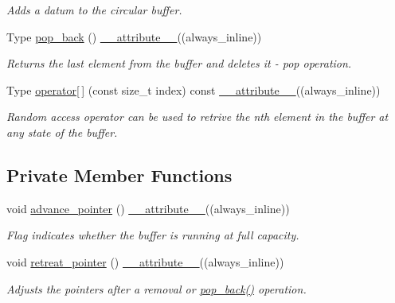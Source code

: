 \begin{DoxyCompactItemize}
\begin{DoxyCompactList}\small\item\em Adds a datum to the circular buffer. \end{DoxyCompactList}\item 
Type \hyperlink{classCircular__Buffer_a0b7b0fb1ecffc75ba233fed043616313}{pop\+\_\+back} () \hyperlink{utilities_8hpp_a103d5b3998e0dd804213c8f30a094f4d}{\+\_\+\+\_\+attribute\+\_\+\+\_\+}((always\+\_\+inline))
\begin{DoxyCompactList}\small\item\em Returns the last element from the buffer and deletes it -\/ pop operation. \end{DoxyCompactList}\item 
Type \hyperlink{classCircular__Buffer_a520f88f6e08b618a3b2923f157db541d}{operator\mbox{[}$\,$\mbox{]}} (const size\+\_\+t index) const \hyperlink{utilities_8hpp_a103d5b3998e0dd804213c8f30a094f4d}{\+\_\+\+\_\+attribute\+\_\+\+\_\+}((always\+\_\+inline))
\begin{DoxyCompactList}\small\item\em Random access operator can be used to retrive the nth element in the buffer at any state of the buffer. \end{DoxyCompactList}\end{DoxyCompactItemize}
\subsection*{Private Member Functions}
\begin{DoxyCompactItemize}
\item 
void \hyperlink{classCircular__Buffer_a4ec86fd625e56d17abe155895cc4cc1b}{advance\+\_\+pointer} () \hyperlink{utilities_8hpp_a103d5b3998e0dd804213c8f30a094f4d}{\+\_\+\+\_\+attribute\+\_\+\+\_\+}((always\+\_\+inline))
\begin{DoxyCompactList}\small\item\em Flag indicates whether the buffer is running at full capacity. \end{DoxyCompactList}\item 
void \hyperlink{classCircular__Buffer_a2b13869f0a5a4904142241a3d15ff141}{retreat\+\_\+pointer} () \hyperlink{utilities_8hpp_a103d5b3998e0dd804213c8f30a094f4d}{\+\_\+\+\_\+attribute\+\_\+\+\_\+}((always\+\_\+inline))
\begin{DoxyCompactList}\small\item\em Adjusts the pointers after a removal or \hyperlink{classCircular__Buffer_a0b7b0fb1ecffc75ba233fed043616313}{pop\+\_\+back()} operation. \end{DoxyCompactList}\end{DoxyCompactItemize}
